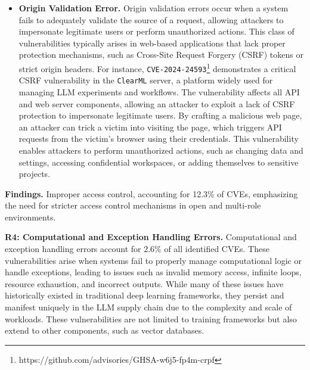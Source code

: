 \begin{itemize}[leftmargin=10pt]
    \item \textbf{Origin Validation Error.} Origin validation errors occur when a system fails to adequately validate the source of a request, allowing attackers to impersonate legitimate users or perform unauthorized actions. This class of vulnerabilities typically arises in web-based applications that lack proper protection mechanisms, such as Cross-Site Request Forgery (CSRF) tokens or strict origin headers. 
    For instance, \texttt{CVE-2024-24593}\footnote{https://github.com/advisories/GHSA-w6j5-fp4m-crpf} demonstrates a critical CSRF vulnerability in the \texttt{ClearML} server, a platform widely used for managing LLM experiments and workflows. The vulnerability affects all API and web server components, allowing an attacker to exploit a lack of CSRF protection to impersonate legitimate users. By crafting a malicious web page, an attacker can trick a victim into visiting the page, which triggers API requests from the victim's browser using their credentials. This vulnerability enables attackers to perform unauthorized actions, such as changing data and settings, accessing confidential workspaces, or adding themselves to sensitive projects.
\end{itemize}

\begin{tcolorbox}  
    \textbf{Findings.}  
    Improper access control, accounting for 12.3\% of CVEs, emphasizing the need for stricter access control mechanisms in open and multi-role environments.
\end{tcolorbox}
    
\noindent \textbf{R4: Computational and Exception Handling Errors.}  
Computational and exception handling errors account for 2.6\% of all identified CVEs. These vulnerabilities arise when systems fail to properly manage computational logic or handle exceptions, leading to issues such as invalid memory access, infinite loops, resource exhaustion, and incorrect outputs. While many of these issues have historically existed in traditional deep learning frameworks, they persist and manifest uniquely in the LLM supply chain due to the complexity and scale of workloads. These vulnerabilities are not limited to training frameworks but also extend to other components, such as vector databases.

